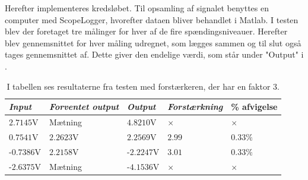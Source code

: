 \noindent Herefter implementeres kredsløbet. Til opsamling af signalet benyttes en computer med ScopeLogger, hvorefter dataen bliver behandlet i Matlab. I testen blev der foretaget tre målinger for hver af de fire spændingsniveauer. Herefter blev gennemsnittet for hver måling udregnet, som lægges sammen og til slut også tages gennemsnittet af. Dette giver den endelige værdi, som står under "Output" i .\

\begin{table}[H]
	\centering
	\begin{tabular}{|l|l|l|l|l|}
		\hline
 \textit{Input} & \textit{Forventet output} & \textit{Output}  &  \textit{Forstærkning}  & \% afvigelse \\ \hline
 $2.7145$V            & Mætning              & $4.8210$V       &    $\times$             & $\times$  \\ \hline
 $0.7541$V            & $2.2623$V            & $2.2569$V       &    $2.99$               & $0.33\%$     \\ \hline
-$0.7386$V           & $2.2158$V            & -$2.2247$V       &    $3.01$               & $0.33\%$     \\ \hline
-$2.6375$V           & Mætning              & -$4.1536$V       &    $\times$             & $\times$    \\ \hline
	\end{tabular}
	\caption{I tabellen ses resultaterne fra testen med forstærkeren, der har en faktor 3.}
	\label{Tab:faktor3_test}
\end{table}

